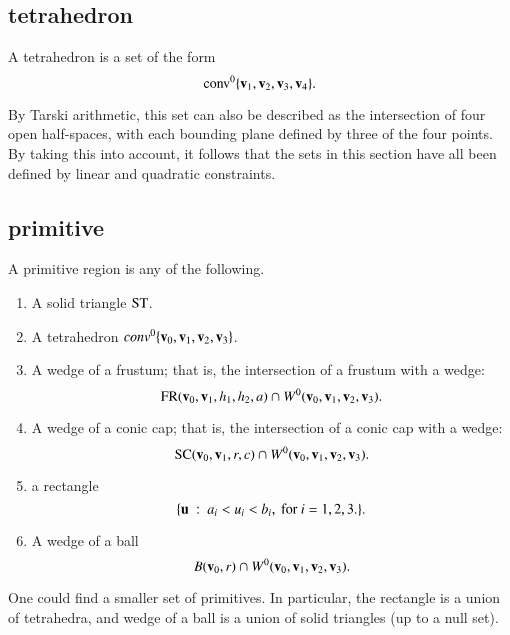 \subsection{tetrahedron}
%

\begin{definition}[tetrahedron] A tetrahedron is a set of the form
$${\operatorname{conv}}^0\{{\mathbf v}_1,{\mathbf v}_2,{\mathbf v}_3,{\mathbf v}_4\}.$$
%
\end{definition}

By Tarski arithmetic, %
this set can also be described
as the intersection of four open half-spaces, with each bounding
plane defined by three of the four points.
By taking this into account, it follows that
the sets in this section have all been defined by linear and quadratic
constraints.
%

\subsection{primitive}
%

\begin{definition}[primitive]\label{def:primitive} 
A primitive region is any of the following.

\begin{enumerate}%
 \item A solid triangle ${\operatorname{ST}}$.
%
 \item A tetrahedron $conv^0\{{\mathbf v}_0,{\mathbf v}_1,{\mathbf v}_2,{\mathbf v}_3\}$.
 \item A wedge of a frustum;
that is, the intersection of a frustum with
 a wedge:
    $$
     {\operatorname{FR}}({\mathbf v}_0,{\mathbf v}_1,h_1,h_2,a) \cap W^0({\mathbf v}_0,{\mathbf v}_1,{\mathbf v}_2,{\mathbf v}_3).
    $$
\item A wedge of a conic cap; that is, the intersection of a conic cap
with
    a wedge:
    $$
    {\operatorname{SC}}({\mathbf v}_0,{\mathbf v}_1,r,c) \cap W^0({\mathbf v}_0,{\mathbf v}_1,{\mathbf v}_2,{\mathbf v}_3).
    $$
\item a rectangle
    $$
    \{{\mathbf u} \ :\  a_i < u_i < b_i,\text { for } i=1,2,3.\}.
    $$
\item A wedge of a ball
  $$
  B({\mathbf v}_0,r) \cap W^0({\mathbf v}_0,{\mathbf v}_1,{\mathbf v}_2,{\mathbf v}_3).
  $$
%
%
%
%
%
%
%
\end{enumerate}
One could find a smaller set of primitives.  In particular, the
rectangle is a union of tetrahedra, and wedge of a ball is a union of solid triangles (up to a null set).  

\end{definition}

